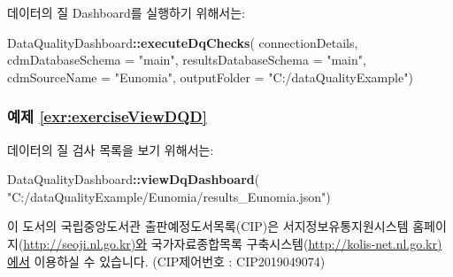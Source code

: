 \documentclass[10.5pt]{book}
\newenvironment{Shaded}{\begin{snugshade}}{\end{snugshade}}
\newcommand{\KeywordTok}[1]{\textcolor[rgb]{0.13,0.29,0.53}{\textbf{#1}}}
\newcommand{\DataTypeTok}[1]{\textcolor[rgb]{0.13,0.29,0.53}{#1}}
\newcommand{\StringTok}[1]{\textcolor[rgb]{0.31,0.60,0.02}{#1}}
\newcommand{\OperatorTok}[1]{\textcolor[rgb]{0.81,0.36,0.00}{\textbf{#1}}}
\newcommand{\NormalTok}[1]{#1}
\theoremstyle{definition}
\theoremstyle{definition}
\theoremstyle{definition}
\theoremstyle{remark}
\begin{document}
데이터의 질 Dashboard를 실행하기 위해서는:

\begin{Shaded}
\begin{Highlighting}[]
\NormalTok{DataQualityDashboard}\OperatorTok{::}\KeywordTok{executeDqChecks}\NormalTok{(}
\NormalTok{  connectionDetails,}
  \DataTypeTok{cdmDatabaseSchema =} \StringTok{"main"}\NormalTok{,}
  \DataTypeTok{resultsDatabaseSchema =} \StringTok{"main"}\NormalTok{,}
  \DataTypeTok{cdmSourceName =} \StringTok{"Eunomia"}\NormalTok{,}
  \DataTypeTok{outputFolder =} \StringTok{"C:/dataQualityExample"}\NormalTok{)}
\end{Highlighting}
\end{Shaded}

\subsubsection*{예제
\ref{exr:exerciseViewDQD}}\label{-refexrexerciseviewdqd}

데이터의 질 검사 목록을 보기 위해서는:

\begin{Shaded}
\begin{Highlighting}[]
\NormalTok{DataQualityDashboard}\OperatorTok{::}\KeywordTok{viewDqDashboard}\NormalTok{(}
  \StringTok{"C:/dataQualityExample/Eunomia/results_Eunomia.json"}\NormalTok{)}
\end{Highlighting}
\end{Shaded}

이 도서의 국립중앙도서관 출판예정도서목록(CIP)은 서지정보유통지원시스템
홈페이지(\url{http://seoji.nl.go.kr)와} 국가자료종합목록
구축시스템(\url{http://kolis-net.nl.go.kr)에서} 이용하실 수 있습니다.
(CIP제어번호 : CIP2019049074)



\backmatter
\printindex
\end{document}
